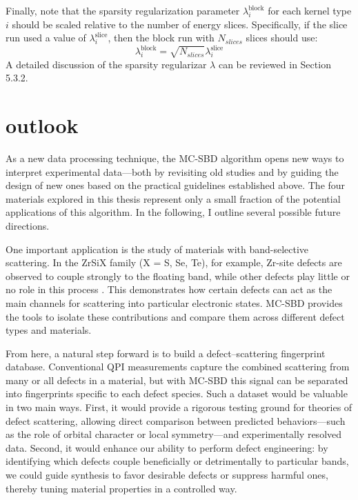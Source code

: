 Finally, note that the sparsity regularization parameter $\lambda_i^{\text{block}}$ for each kernel type $i$ should be scaled relative to the number of energy slices. Specifically, if the slice run used a value of $\lambda_i^{\text{slice}}$, then the block run with $N_{slices}$ slices should use:
\begin{equation}
	\lambda_i^{\text{block}} = \sqrt{N_{slices}}\lambda_i^{\text{slice}}
\end{equation}
A detailed discussion of the sparsity regularizar $\lambda$ can be reviewed in Section 5.3.2. 

\section{outlook}
As a new data processing technique, the MC-SBD algorithm opens new ways to interpret experimental data—both by revisiting old studies and by guiding the design of new ones based on the practical guidelines established above. The four materials explored in this thesis represent only a small fraction of the potential applications of this algorithm. In the following, I outline several possible future directions.

One important application is the study of materials with band-selective scattering. In the ZrSiX family (X = S, Se, Te), for example, Zr-site defects are observed to couple strongly to the floating band, while other defects play little or no role in this process \cite{butlerQuasiparticleInterferenceZrSiS2017}\cite{buVisualizationElectronicTopology2018}\cite{stuartScanningTunnellingMicroscopy2021}. This demonstrates how certain defects can act as the main channels for scattering into particular electronic states. MC-SBD provides the tools to isolate these contributions and compare them across different defect types and materials.

From here, a natural step forward is to build a defect–scattering fingerprint database. Conventional QPI measurements capture the combined scattering from many or all defects in a material, but with MC-SBD this signal can be separated into fingerprints specific to each defect species. Such a dataset would be valuable in two main ways. First, it would provide a rigorous testing ground for theories of defect scattering, allowing direct comparison between predicted behaviors—such as the role of orbital character or local symmetry—and experimentally resolved data. Second, it would enhance our ability to perform defect engineering: by identifying which defects couple beneficially or detrimentally to particular bands, we could guide synthesis to favor desirable defects or suppress harmful ones, thereby tuning material properties in a controlled way.

